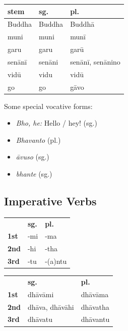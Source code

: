 \documentclass[11pt,oneside]{memoir}
\begin{document}
\bigskip
{\centering\par
\begin{multicols}{2}

\begin{center}
\begin{tabular}{lll}
stem & sg. & pl.\\
\hline
Buddha & Buddha & Buddhā\\
muni & muni & munī\\
garu & garu & garū\\
senānī & senāni & senānī, senānino\\
vidū & vidu & vidū\\
go & go & gāvo\\
\end{tabular}
\end{center}

\columnbreak

Some special vocative forms:

\begin{itemize}
\item \emph{Bho, he:} Hello / hey! (sg.)
\item \emph{Bhavanto} (pl.)
\item \emph{āvuso} (sg.)
\item \emph{bhante} (sg.)
\end{itemize}

\end{multicols}
\par}
\subsection{Imperative Verbs}
\label{sec:org8d42ae5}

{\centering\par
\begin{multicols}{2}

\begin{center}
\begin{tabular}{lll}
 & \textbf{sg.} & \textbf{pl.}\\
\textbf{1st} & -mi & -ma\\
\textbf{2nd} & -hi & -tha\\
\textbf{3rd} & -tu & -(a)ntu\\
\end{tabular}
\end{center}

\columnbreak

\begin{center}
\begin{tabular}{lll}
 & \textbf{sg.} & \textbf{pl.}\\
\textbf{1st} & dhāvāmi & dhāvāma\\
\textbf{2nd} & dhāva, dhāvāhi & dhāvatha\\
\textbf{3rd} & dhāvatu & dhāvantu\\
\end{tabular}
\end{center}

\end{multicols}
\par}
\end{document}
